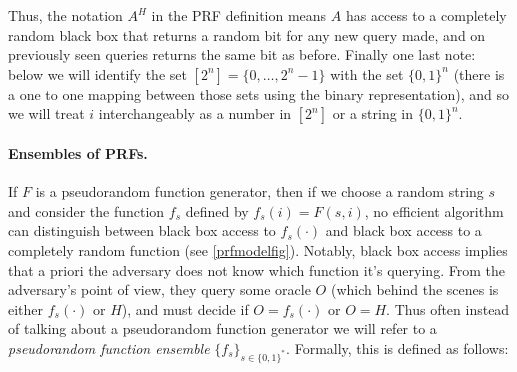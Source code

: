 
Thus, the notation \(A^H\) in the PRF definition means \(A\) has access
to a completely random black box that returns a random bit for any new
query made, and on previously seen queries returns the same bit as
before. Finally one last note: below we will identify the set
\([2^n] = \{0,\ldots,2^n-1\}\) with the set \(\{0,1\}^n\) (there is a
one to one mapping between those sets using the binary representation),
and so we will treat \(i\) interchangeably as a number in \([2^n]\) or a
string in \(\{0,1\}^n\).

\paragraph{Ensembles of PRFs.} If \(F\) is a pseudorandom function
generator, then if we choose a random string \(s\) and consider the
function \(f_s\) defined by \(f_s(i) = F(s,i)\), no efficient algorithm
can distinguish between black box access to \(f_s(\cdot)\) and black box
access to a completely random function (see \cref{prfmodelfig}).
Notably, black box access implies that a priori the adversary does not
know which function it's querying. From the adversary's point of view,
they query some oracle \(O\) (which behind the scenes is either
\(f_s(\cdot)\) or \(H\)), and must decide if \(O = f_s(\cdot)\) or
\(O = H\). Thus often instead of talking about a pseudorandom function
generator we will refer to a \emph{pseudorandom function ensemble}
\(\{ f_s \}_{s\in \{0,1\}^*}\). Formally, this is defined as follows:

\hypertarget{prfensemnledef}{}

